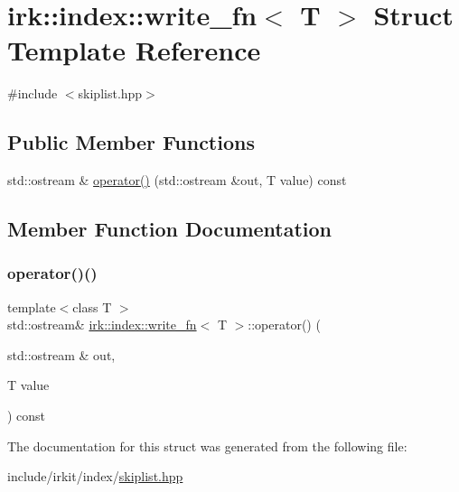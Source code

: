 \hypertarget{structirk_1_1index_1_1write__fn}{}\section{irk\+:\+:index\+:\+:write\+\_\+fn$<$ T $>$ Struct Template Reference}
\label{structirk_1_1index_1_1write__fn}


{\ttfamily \#include $<$skiplist.\+hpp$>$}

\subsection*{Public Member Functions}
\begin{DoxyCompactItemize}
\item 
std\+::ostream \& \mbox{\hyperlink{structirk_1_1index_1_1write__fn_a66bc60aa84f1256fad609bd056b5d68d}{operator()}} (std\+::ostream \&out, T value) const
\end{DoxyCompactItemize}


\subsection{Member Function Documentation}
\mbox{\label{structirk_1_1index_1_1write__fn_a66bc60aa84f1256fad609bd056b5d68d}} 
\subsubsection{\texorpdfstring{operator()()}{operator()()}}
{\footnotesize\ttfamily template$<$class T $>$ \\
std\+::ostream\& \mbox{\hyperlink{structirk_1_1index_1_1write__fn}{irk\+::index\+::write\+\_\+fn}}$<$ T $>$\+::operator() (\begin{DoxyParamCaption}\item[{std\+::ostream \&}]{out,  }\item[{T}]{value }\end{DoxyParamCaption}) const\hspace{0.3cm}{\ttfamily [inline]}}



The documentation for this struct was generated from the following file\+:\begin{DoxyCompactItemize}
\item 
include/irkit/index/\mbox{\hyperlink{skiplist_8hpp}{skiplist.\+hpp}}\end{DoxyCompactItemize}
